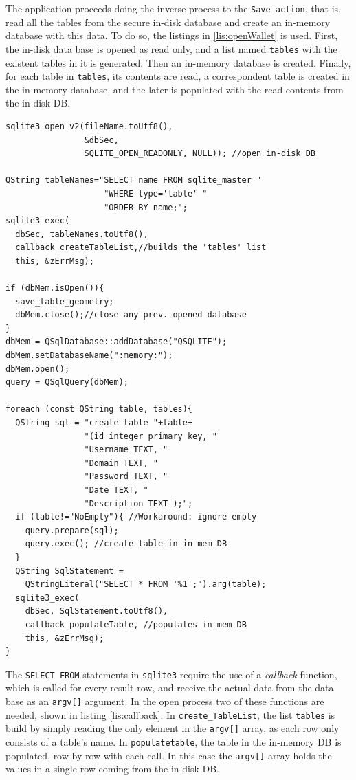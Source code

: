 The application proceeds doing the inverse process to the \texttt{Save\_action}, that is, read all the tables from the secure in-disk database and create an in-memory database with this data. To do so, the listings in \ref{lis:openWallet} is used. First, the in-disk data base is opened as read only, and a list named \texttt{tables} with the existent tables in it is generated. Then an in-memory database is created. Finally, for each table in \texttt{tables}, its contents are read, a correspondent table is created in the in-memory database, and the later is populated with the read contents from the in-disk DB.
\begin{lstlisting}[style=customc, float=htb, caption={Simplified Open Wallet action}, label = {lis:openWallet}]
sqlite3_open_v2(fileName.toUtf8(),
                &dbSec, 
                SQLITE_OPEN_READONLY, NULL)); //open in-disk DB

QString tableNames="SELECT name FROM sqlite_master "
                    "WHERE type='table' "
                    "ORDER BY name;";
sqlite3_exec(
  dbSec, tableNames.toUtf8(), 
  callback_createTableList,//builds the 'tables' list 
  this, &zErrMsg);

if (dbMem.isOpen()){ 
  save_table_geometry;
  dbMem.close();//close any prev. opened database
}
dbMem = QSqlDatabase::addDatabase("QSQLITE");
dbMem.setDatabaseName(":memory:");
dbMem.open();
query = QSqlQuery(dbMem);

foreach (const QString table, tables){
  QString sql = "create table "+table+
                "(id integer primary key, "
                "Username TEXT, "
                "Domain TEXT, "
                "Password TEXT, "
                "Date TEXT, "
                "Description TEXT );";
  if (table!="NoEmpty"){ //Workaround: ignore empty
    query.prepare(sql);
    query.exec(); //create table in in-mem DB
  }
  QString SqlStatement = 
    QStringLiteral("SELECT * FROM '%1';").arg(table);
  sqlite3_exec(
    dbSec, SqlStatement.toUtf8(), 
    callback_populateTable, //populates in-mem DB
    this, &zErrMsg);
}
\end{lstlisting}


The \texttt{SELECT FROM} statements in \texttt{sqlite3} require the use of a \textsl{callback} function, which is called for every result row, and receive the actual data from the data base as an \texttt{argv[]} argument. In the open process two of these functions are needed, shown in listing \ref{lis:callback}. 
In \texttt{create\_TableList}, the list \texttt{tables} is build by simply reading the only element in the \texttt{argv[]} array, as each row only consists of a table's name. 
In \texttt{populatetable}, the table in the in-memory DB is populated, row by row with each call.  In this case the \texttt{argv[]} array holds the values in a single row coming from the in-disk DB.

